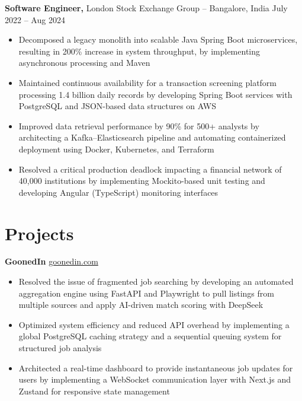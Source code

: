 \documentclass[11pt]{article}       %
\begin{document}
\textbf{Software Engineer,} {London Stock Exchange Group} -- Bangalore, India \hfill July 2022 -- Aug 2024 \\
\vspace{-9pt}
\begin{itemize}
  \item Decomposed a legacy monolith into scalable Java Spring Boot microservices, resulting in 200\% increase in system throughput, by implementing asynchronous processing and Maven
  \item Maintained continuous availability for a transaction screening platform processing 1.4 billion daily records by developing Spring Boot services with PostgreSQL and JSON-based data structures on AWS
  \item Improved data retrieval performance by 90\% for 500+ analysts by architecting a Kafka–Elasticsearch pipeline and automating containerized deployment using Docker, Kubernetes, and Terraform
  \item Resolved a critical production deadlock impacting a financial network of 40,000 institutions by implementing Mockito-based unit testing and developing Angular (TypeScript) monitoring interfaces
\end{itemize}

\vspace{-18.5pt}

\section*{Projects}
\textbf{GoonedIn} \hfill \href{https://goonedin.vercel.app/}{goonedin.com} \\
\vspace{-9pt}
\begin{itemize}
  \item Resolved the issue of fragmented job searching by developing an automated aggregation engine using FastAPI and Playwright to pull listings from multiple sources and apply AI-driven match scoring with DeepSeek
  \item Optimized system efficiency and reduced API overhead by implementing a global PostgreSQL caching strategy and a sequential queuing system for structured job analysis
  \item Architected a real-time dashboard to provide instantaneous job updates for users by implementing a WebSocket communication layer with Next.js and Zustand for responsive state management
\end{itemize}
\end{document}
